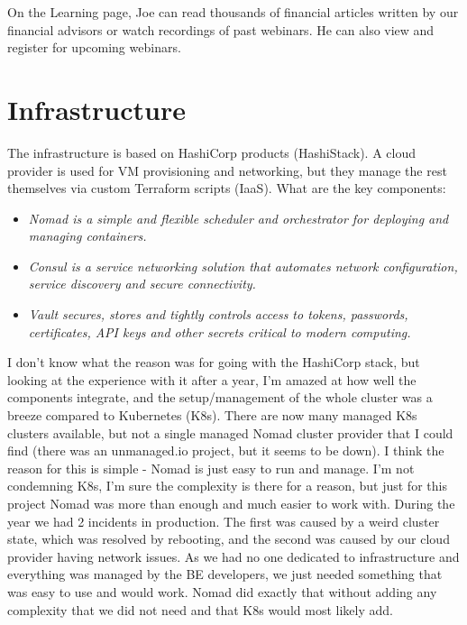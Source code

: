 \begin{example}[Education]
    On the Learning page, Joe can read thousands of financial articles written by our financial advisors or watch recordings of past webinars. He can also view and register for upcoming webinars.
\end{example}



\section{Infrastructure}
The infrastructure is based on HashiCorp products (HashiStack). A cloud provider is used for VM provisioning and networking, but they manage the rest themselves via custom Terraform scripts (IaaS). What are the key components:
\begin{itemize}
    \item \it{Nomad} is a simple and flexible scheduler and orchestrator for deploying and managing containers. \cite{NOMAD}
    \item \it{Consul} is a service networking solution that automates network configuration, service discovery and secure connectivity. \cite{CONSUL}
    \item \it{Vault} secures, stores and tightly controls access to tokens, passwords, certificates, API keys and other secrets critical to modern computing. \cite{VAULT}
\end{itemize}

I don't know what the reason was for going with the HashiCorp stack, but looking at the experience with it after a year, I'm amazed at how well the components integrate, and the setup/management of the whole cluster was a breeze compared to Kubernetes (K8s). There are now many managed K8s clusters available, but not a single managed Nomad cluster provider that I could find (there was an unmanaged.io project, but it seems to be down). I think the reason for this is simple - Nomad is just easy to run and manage. I'm not condemning K8s, I'm sure the complexity is there for a reason, but just for this project Nomad was more than enough and much easier to work with. During the year we had 2 incidents in production. The first was caused by a weird cluster state, which was resolved by rebooting, and the second was caused by our cloud provider having network issues. As we had no one dedicated to infrastructure and everything was managed by the BE developers, we just needed something that was easy to use and would work. Nomad did exactly that without adding any complexity that we did not need and that K8s would most likely add.

